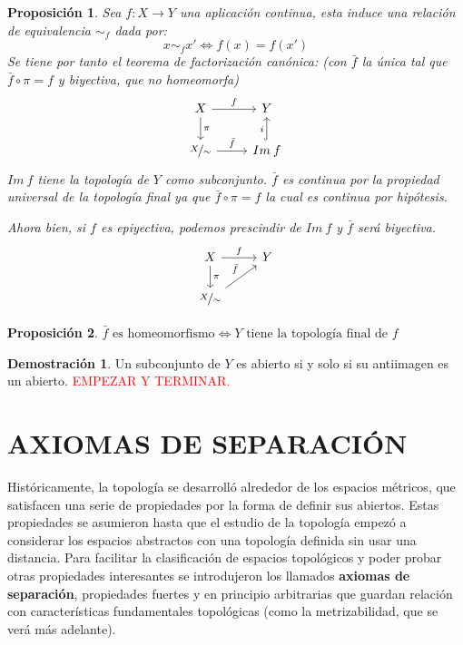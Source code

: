 \documentclass[12pt,twoside]{report}
\theoremstyle{azul}
\theoremstyle{azul2}
\theoremstyle{plain}
\newtheorem*{prop}{Proposición}
\theoremstyle{definition}
\newtheorem*{dem}{Demostración}
\theoremstyle{remark}
\begin{document}
\begin{prop}
Sea $f: X \longrightarrow Y$ una aplicación continua, esta induce una relación de equivalencia $\sim_f$ dada por:
$$x \sim_f x' \iff f(x)=f(x') $$
Se tiene por tanto el teorema de factorización canónica: (con $\bar{f}$ la única tal que $\bar{f} \circ \pi=f$ y biyectiva, que no homeomorfa)
$$\begin{tikzcd}
X \arrow{r}{f} \arrow{d}{\pi} & Y \\
\mathlarger{\nicefrac{X}{\sim }}  \arrow{r}{\bar{f}} & Im \: f  \arrow[hookrightarrow]{u}{i}
\end{tikzcd}
$$
$Im \: f$ tiene la topología de $Y$ como subconjunto. $\bar{f}$ es continua por la propiedad universal de la topología final ya que $\bar{f} \circ \pi = f $ la cual es continua por hipótesis. 

Ahora bien, si $f$ es epiyectiva, podemos prescindir de $Im \: f$ y $\bar{f}$ será biyectiva. $$\begin{tikzcd}
X \arrow{r}{f} \arrow{d}{\pi} & Y \\
 \mathlarger{\nicefrac{X}{\sim }}  \arrow{ru}{\bar{f}} & 
\end{tikzcd}
$$
\end{prop}
\begin{prop}
$\bar{f} \text{ es homeomorfismo} \iff Y \text{ tiene la topología final de } f$
\end{prop}
\begin{dem}
Un subconjunto de $Y$ es abierto si y solo si su antiimagen es un abierto. \textcolor{red}{EMPEZAR Y TERMINAR.}
\end{dem}



\chapter{AXIOMAS DE SEPARACIÓN}

\justifying Históricamente, la topología se desarrolló alrededor de los espacios métricos, que satisfacen una serie de propiedades por la forma de definir sus abiertos. Estas propiedades se asumieron hasta que el estudio de la topología empezó a considerar los espacios abstractos con una topología definida sin usar una distancia. Para facilitar la clasificación de espacios topológicos y poder probar otras propiedades interesantes se introdujeron los llamados \textbf{axiomas de separación}, propiedades fuertes y en principio arbitrarias que guardan relación con características fundamentales topológicas (como la metrizabilidad, que se verá más adelante). 
\end{document}
